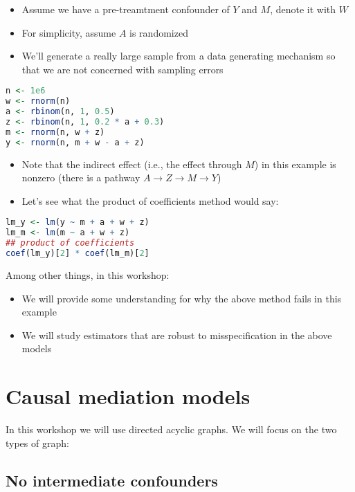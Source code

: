 \documentclass[
  12pt,
]{book}
\providecommand{\tightlist}{%
  \setlength{\itemsep}{0pt}\setlength{\parskip}{0pt}}
\theoremstyle{definition}
\theoremstyle{definition}
\theoremstyle{definition}
\newcommand{\1}{\mathbbm{1}}
\begin{document}
\begin{itemize}
\tightlist
\item
  Assume we have a pre-treamtment confounder of \(Y\) and \(M\), denote it with \(W\)
\item
  For simplicity, assume \(A\) is randomized
\item
  We'll generate a really large sample from a data generating mechanism so that
  we are not concerned with sampling errors
\end{itemize}

\begin{lstlisting}[language=R]
n <- 1e6
w <- rnorm(n)
a <- rbinom(n, 1, 0.5)
z <- rbinom(n, 1, 0.2 * a + 0.3)
m <- rnorm(n, w + z)
y <- rnorm(n, m + w - a + z)
\end{lstlisting}

\begin{itemize}
\tightlist
\item
  Note that the indirect effect (i.e., the effect through \(M\)) in this example
  is nonzero (there is a pathway \(A\rightarrow Z \rightarrow M \rightarrow Y\))
\item
  Let's see what the product of coefficients method would say:
\end{itemize}

\begin{lstlisting}[language=R]
lm_y <- lm(y ~ m + a + w + z)
lm_m <- lm(m ~ a + w + z)
## product of coefficients
coef(lm_y)[2] * coef(lm_m)[2]
\end{lstlisting}

Among other things, in this workshop:

\begin{itemize}
\tightlist
\item
  We will provide some understanding for why the above method fails in this
  example
\item
  We will study estimators that are robust to misspecification in the above
  models
\end{itemize}

\hypertarget{causal-mediation-models}{%
\section{Causal mediation models}\label{causal-mediation-models}}

In this workshop we will use directed acyclic graphs. We will focus on the two
types of graph:

\hypertarget{no-intermediate-confounders}{%
\subsection{No intermediate confounders}\label{no-intermediate-confounders}}
\end{document}
